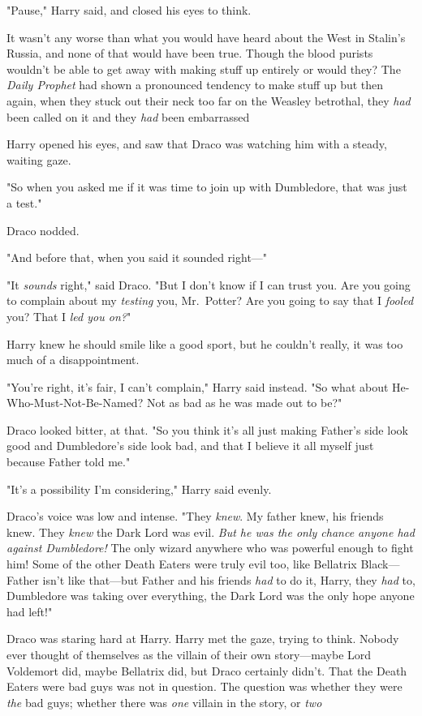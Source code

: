 "Pause," Harry said, and closed his eyes to think.

It wasn't any worse than what you would have heard about the West in Stalin's
Russia, and none of that would have been true. Though the blood purists
wouldn't be able to get away with making stuff up entirely{\el} or would
they? The \emph{Daily Prophet} had shown a pronounced tendency to make stuff
up{\el} but then again, when they stuck out their neck too far on the
Weasley betrothal, they \emph{had} been called on it and they \emph{had} been
embarrassed{\el}

Harry opened his eyes, and saw that Draco was watching him with a steady,
waiting gaze.

"So when you asked me if it was time to join up with Dumbledore, that was just
a test."

Draco nodded.

"And before that, when you said it sounded right\mbox{---}"

"It \emph{sounds} right," said Draco. "But I don't know if I can trust you. Are
you going to complain about my \emph{testing} you, Mr.~Potter? Are you going to
say that I \emph{fooled} you? That I \emph{led you on?}"

Harry knew he should smile like a good sport, but he couldn't really, it was
too much of a disappointment.

"You're right, it's fair, I can't complain," Harry said instead. "So what about
He-Who-Must-Not-Be-Named? Not as bad as he was made out to be?"

Draco looked bitter, at that. "So you think it's all just making Father's side
look good and Dumbledore's side look bad, and that I believe it all myself just
because Father told me."

"It's a possibility I'm considering," Harry said evenly.

Draco's voice was low and intense. "They \emph{knew}. My father knew, his
friends knew. They \emph{knew} the Dark Lord was evil. \emph{But he was the
only chance anyone had against Dumbledore!} The only wizard anywhere who was
powerful enough to fight him! Some of the other Death Eaters were truly evil
too, like Bellatrix Black---Father isn't like that---but Father and his friends
\emph{had} to do it, Harry, they \emph{had} to, Dumbledore was taking over
everything, the Dark Lord was the only hope anyone had left!"

Draco was staring hard at Harry. Harry met the gaze, trying to think. Nobody
ever thought of themselves as the villain of their own story---maybe Lord
Voldemort did, maybe Bellatrix did, but Draco certainly didn't. That the Death
Eaters were bad guys was not in question. The question was whether they were
\emph{the} bad guys; whether there was \emph{one} villain in the story, or
\emph{two{\el}}

